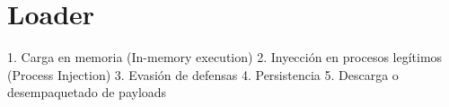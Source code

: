 \section{Loader}

1. Carga en memoria (In-memory execution)
2. Inyección en procesos legítimos (Process Injection)
3. Evasión de defensas
4. Persistencia
5. Descarga o desempaquetado de payloads



